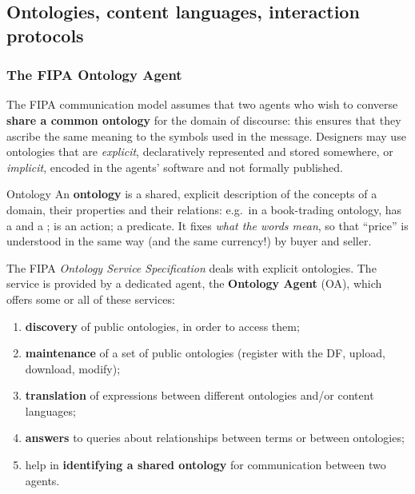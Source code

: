 \subsection{Ontologies, content languages, interaction protocols}
\label{sec:ontologies-protocols}

\subsubsection{The FIPA Ontology Agent}

The FIPA communication model assumes that two agents who wish to converse \textbf{share a
common ontology} for the domain of discourse: this ensures that they ascribe the same
meaning to the symbols used in the message. Designers may use ontologies that are
\emph{explicit}, declaratively represented and stored somewhere, or \emph{implicit}, encoded
in the agents' software and not formally published.

\begin{nbdef}{Ontology}
\notinslides
An \textbf{ontology} is a shared, explicit description of the concepts of a domain, their
properties and their relations: e.g.\ in a book-trading ontology,  has a
 and a ;  is an action;
 a predicate. It fixes \emph{what the words mean}, so that ``price''
is understood in the same way (and the same currency!) by buyer and seller.
\end{nbdef}

The FIPA \emph{Ontology Service Specification} deals with explicit ontologies. The service
is provided by a dedicated agent, the \textbf{Ontology Agent} (OA), which offers some or all
of these services:
\begin{enumerate}[nosep]
  \item \textbf{discovery} of public ontologies, in order to access them;
  \item \textbf{maintenance} of a set of public ontologies (register with the DF, upload,
        download, modify);
  \item \textbf{translation} of expressions between different ontologies and/or content
        languages;
  \item \textbf{answers} to queries about relationships between terms or between ontologies;
  \item help in \textbf{identifying a shared ontology} for communication between two agents.
\end{enumerate}


